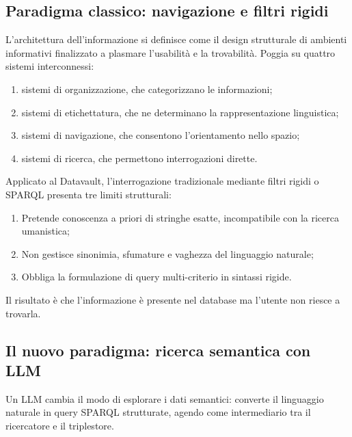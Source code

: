     \subsection{Paradigma classico: navigazione e filtri rigidi}\label{subsec:paradigma_classico}

    L'architettura dell'informazione si definisce come il design strutturale di ambienti informativi finalizzato a plasmare l'usabilità e la trovabilità\cite{Mor08}. Poggia su quattro sistemi interconnessi:

    \begin{enumerate}[label={(\roman*)}]
        \item sistemi di organizzazione, che categorizzano le informazioni;
        \item sistemi di etichettatura, che ne determinano la rappresentazione linguistica;
        \item sistemi di navigazione, che consentono l'orientamento nello spazio;
        \item sistemi di ricerca, che permettono interrogazioni dirette.
    \end{enumerate}

    Applicato al Datavault, l'interrogazione tradizionale mediante filtri rigidi o SPARQL presenta tre limiti strutturali:

    \begin{enumerate}
        \item Pretende conoscenza a priori di stringhe esatte, incompatibile con la ricerca umanistica\hfill\cite{Vas24};
        \item Non gestisce sinonimia, sfumature e vaghezza del linguaggio naturale;
        \item Obbliga la formulazione di query multi-criterio in sintassi rigide.
    \end{enumerate}

    Il risultato è che l'informazione è presente nel database ma l'utente non riesce a trovarla.

    \subsection{Il nuovo paradigma: ricerca semantica con LLM}\label{subsec:paradigma_semantico}

    Un LLM cambia il modo di esplorare i dati semantici: converte il linguaggio naturale in query SPARQL strutturate, agendo come intermediario tra il ricercatore e il triplestore.\@

